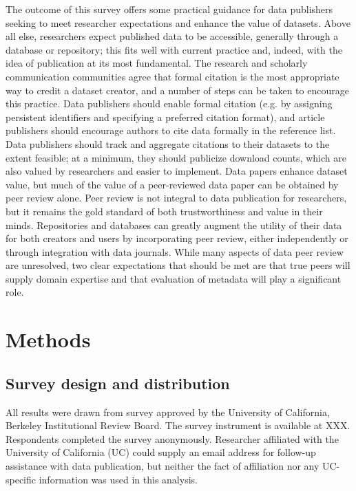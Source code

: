 \documentclass[10pt]{article}
\begin{document}
The outcome of this survey offers some practical guidance for data publishers seeking to meet researcher expectations and enhance the value of datasets.
Above all else, researchers expect published data to be accessible, generally through a database or repository; this fits well with current practice and, indeed, with the idea of publication at its most fundamental.
The research and scholarly communication communities agree that formal citation is the most appropriate way to credit a dataset creator, and a number of steps can be taken to encourage this practice.
Data publishers should enable formal citation (e.g. by assigning persistent identifiers and specifying a preferred citation format), and article publishers should encourage authors to cite data formally in the reference list.
Data publishers should track and aggregate citations to their datasets to the extent feasible; at a minimum, they should publicize download counts, which are also valued by researchers and easier to implement.
Data papers enhance dataset value, but much of the value of a peer-reviewed data paper can be obtained by peer review alone.
Peer review is not integral to data publication for researchers, but it remains the gold standard of both trustworthiness and value in their minds.
Repositories and databases can greatly augment the utility of their data for both creators and users by incorporating peer review, either independently or through integration with data journals.
While many aspects of data peer review are unresolved, two clear expectations that should be met are that true peers will supply domain expertise and that evaluation of metadata will play a significant role.


\section*{Methods}

\subsection*{Survey design and distribution}
All results were drawn from survey approved by the University of California, Berkeley Institutional Review Board. %
The survey instrument is available at XXX.
Respondents completed the survey anonymously.
Researcher affiliated with the University of California (UC) could supply an email address for follow-up assistance with data publication, but neither the fact of affiliation nor any UC-specific information was used in this analysis.
\end{document}
